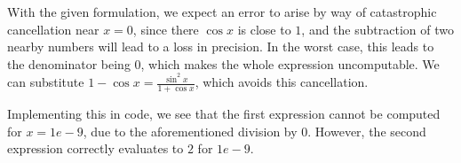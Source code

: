 With the given formulation, we expect an error to arise by way of catastrophic cancellation near $x = 0$, since there $\cos x$ is close to $1$, and the subtraction of two nearby numbers will lead to a loss in precision. In the worst case, this leads to the denominator being $0$, which makes the whole expression uncomputable. We can substitute $1 - \cos x = \frac{\sin^2 x}{1 + \cos x}$, which avoids this cancellation.\bigskip

Implementing this in code, we see that the first expression cannot be computed for $x = 1e-9$, due to the aforementioned division by $0$. However, the second expression correctly evaluates to $2$ for $1e-9$.